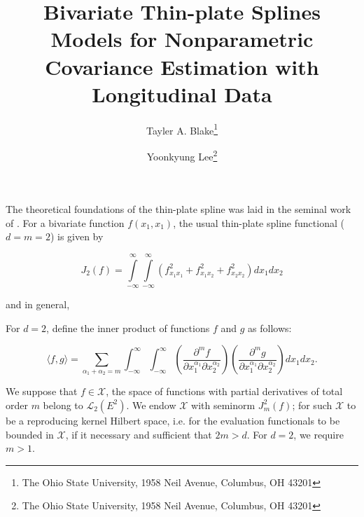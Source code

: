 \documentclass[12pt]{article}
\theoremstyle{definition}
\begin{document}
\title{Bivariate Thin-plate Splines Models for Nonparametric Covariance Estimation with Longitudinal Data}

\author{Tayler A. Blake\thanks{The Ohio State University, 1958 Neil Avenue, Columbus, OH 43201} \and  Yoonkyung Lee\thanks{The Ohio State University, 1958 Neil Avenue, Columbus, OH 43201}}

\maketitle

The theoretical foundations of the thin-plate spline was laid in the seminal work of \citet{duchon1977splines}. For a bivariate function $f\left(x_1,x_1\right)$, the usual thin-plate spline functional ($d=m=2$) is given by

\begin{equation} \label{eq:thin-plate-order-2-penalty}
J_2 \left(f \right) = \int \limits_{-\infty}^{\infty} \int \limits_{-\infty}^{\infty}  \left( f_{{x_1} {x_1}}^2 + f_{{x_1} {x_2}}^2 + f_{{x_2} {x_2}}^2  \right) dx_1 dx_2
\end{equation}

and in general, 

For $d=2$, define the inner product of functions $f$ and $g$ as follows:

\begin{equation} \label{eq:thin-plate-inner-product}
\langle f,g \rangle = \sum_{\alpha_1 + \alpha_2=m} \int_{-\infty}^{\infty} \int_{-\infty}^{\infty} \left(  \frac{\partial^m f}{\partial x_1^{\alpha_1} \partial x_2^{\alpha_2}}  \right)\left(  \frac{\partial^m g}{\partial x_1^{\alpha_1} \partial x_2^{\alpha_2}}  \right) dx_1 dx_2 .
\end{equation}

\bigskip

We suppose that $f \in \mathcal{X}$, the space of functions with partial derivatives of total order $m$ belong to $\mathcal{L}_2\left(E^2\right)$. We endow $\mathcal{X}$ with seminorm $J^2_m\left( f \right)$; for such $\mathcal{X}$ to be a reproducing kernel Hilbert space, i.e. for the evaluation functionals to be bounded in $\mathcal{X}$, if it necessary and sufficient that $2m > d$. For $d=2$, we require $m>1$.
\end{document}
